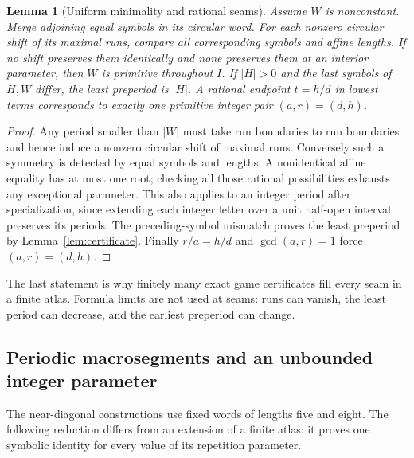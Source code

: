 \documentclass[11pt]{article}
\newtheorem{lemma}[theorem]{Lemma}
\theoremstyle{remark}\newtheorem{remark}[theorem]{Remark}
\begin{document}
\begin{lemma}[Uniform minimality and rational seams]\label{lem:atlas-min}
Assume $W$ is nonconstant. Merge adjoining equal symbols in its circular word. For each nonzero circular shift of its maximal runs, compare all corresponding symbols and affine lengths. If no shift preserves them identically and none preserves them at an interior parameter, then $W$ is primitive throughout $I$. If $|H|>0$ and the last symbols of $H,W$ differ, the least preperiod is $|H|$. A rational endpoint $t=h/d$ in lowest terms corresponds to exactly one primitive integer pair $(a,r)=(d,h)$.
\end{lemma}
\begin{proof}
Any period smaller than $|W|$ must take run boundaries to run boundaries and hence induce a nonzero circular shift of maximal runs. Conversely such a symmetry is detected by equal symbols and lengths. A nonidentical affine equality has at most one root; checking all those rational possibilities exhausts any exceptional parameter. This also applies to an integer period after specialization, since extending each integer letter over a unit half-open interval preserves its periods. The preceding-symbol mismatch proves the least preperiod by Lemma~\ref{lem:certificate}. Finally $r/a=h/d$ and $\gcd(a,r)=1$ force $(a,r)=(d,h)$.
\end{proof}
The last statement is why finitely many exact game certificates fill every seam in a finite atlas. Formula limits are not used at seams: runs can vanish, the least period can decrease, and the earliest preperiod can change.


\subsection{Periodic macrosegments and an unbounded integer parameter}
The near-diagonal constructions use fixed words of lengths five and eight.
The following reduction differs from an extension of a finite atlas: it
proves one symbolic identity for every value of its repetition parameter.
\end{document}
